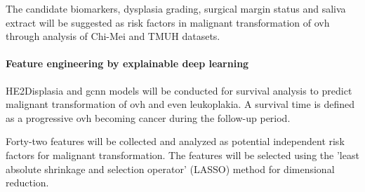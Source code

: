 \documentclass[12pt, a4paper]{article}
\begin{document}
The candidate biomarkers, dysplasia grading, surgical margin status and saliva extract will be suggested as risk factors in malignant transformation of \acrshort{ovh} through analysis of Chi-Mei and TMUH datasets.


\paragraph{Feature engineering by explainable deep learning}




HE2Displasia and \acrfull{gcnn} models will be conducted for survival analysis to predict malignant transformation of \acrshort{ovh} and even leukoplakia.
A survival time is defined as a progressive \acrshort{ovh} becoming cancer during the follow-up period.


Forty-two features will be collected and analyzed as potential independent risk factors for malignant transformation. 
The features will be selected using the 'least absolute shrinkage and selection operator' (LASSO) method for dimensional reduction.
\end{document}
